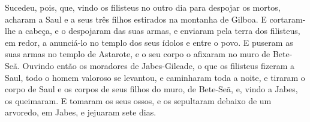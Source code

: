 Sucedeu, pois, que, vindo os filisteus no outro dia para despojar
os mortos, acharam a Saul e a seus três filhos estirados na montanha
de Gilboa. E cortaram-lhe a cabeça, e o despojaram das suas
armas, e enviaram pela terra dos filisteus, em redor, a anunciá-lo
no templo dos seus ídolos e entre o povo. E puseram as suas
armas no templo de Astarote, e o seu corpo o afixaram no muro de
Bete-Seã. Ouvindo então os moradores de Jabes-Gileade, o que
os filisteus fizeram a Saul, todo o homem valoroso se
levantou, e caminharam toda a noite, e tiraram o corpo de Saul e os
corpos de seus filhos do muro, de Bete-Seã, e, vindo a Jabes, os
queimaram. E tomaram os seus ossos, e os sepultaram debaixo
de um arvoredo, em Jabes, e jejuaram sete dias.


